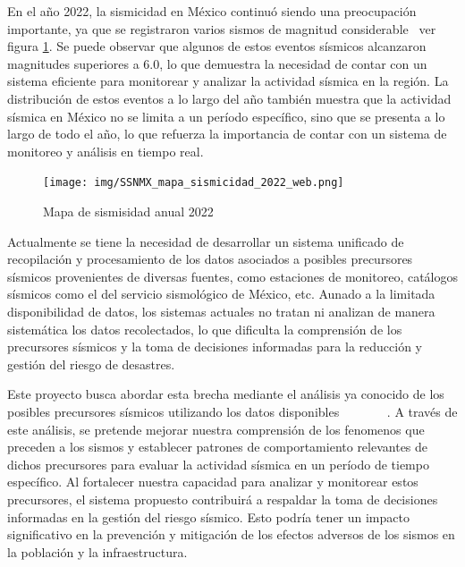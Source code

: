 En el año 2022, la sismicidad en México continuó siendo una preocupación importante, ya que se registraron varios sismos de magnitud considerable~\cite{SSN} ver figura \ref{fig:Mapa de sismisidad anual 2022}. Se puede observar que algunos de estos eventos sísmicos alcanzaron magnitudes superiores a 6.0, lo que demuestra la necesidad de contar con un sistema eficiente para monitorear y analizar la actividad sísmica en la región. La distribución de estos eventos a lo largo del año también muestra que la actividad sísmica en México no se limita a un período específico, sino que se presenta a lo largo de todo el año, lo que refuerza la importancia de contar con un sistema de monitoreo y análisis en tiempo real.
\begin{figure}[H]
    \centering
    \texttt{[image: img/SSNMX\_mapa\_sismicidad\_2022\_web.png]}
    \caption{Mapa de sismisidad anual 2022}
    \label{fig:Mapa de sismisidad anual 2022}
\end{figure}


Actualmente se tiene la necesidad de desarrollar un sistema unificado de recopilación y procesamiento de los datos asociados a posibles precursores sísmicos provenientes de diversas fuentes, como estaciones de monitoreo, catálogos sísmicos como el del servicio sismológico de México, etc. Aunado a la limitada disponibilidad de datos, los sistemas actuales no tratan ni analizan de manera sistemática los datos recolectados, lo que dificulta la comprensión de los precursores sísmicos y la toma de decisiones informadas para la reducción y gestión del riesgo de desastres.

Este proyecto busca abordar esta brecha mediante el análisis ya conocido de los posibles precursores sísmicos utilizando los datos disponibles ~\cite{mcnally1983seismic}~\cite{scholz1997whatever}~\cite{varotsos1984physical}~\cite{yepez1995electric}~\cite{hayakawa1999fractal}~\cite{hayakawa2007monitoring}~\cite{Bhardwaj2021}. A través de este análisis, se pretende mejorar nuestra comprensión de los fenomenos que preceden a los sismos y establecer patrones de comportamiento relevantes de dichos precursores para evaluar la actividad sísmica en un período de tiempo específico\cite{Bhardwaj2021}. Al fortalecer nuestra capacidad para analizar y monitorear estos precursores, el sistema propuesto contribuirá a respaldar la toma de decisiones informadas en la gestión del riesgo sísmico. Esto podría tener un impacto significativo en la prevención y mitigación de los efectos adversos de los sismos en la población y la infraestructura.